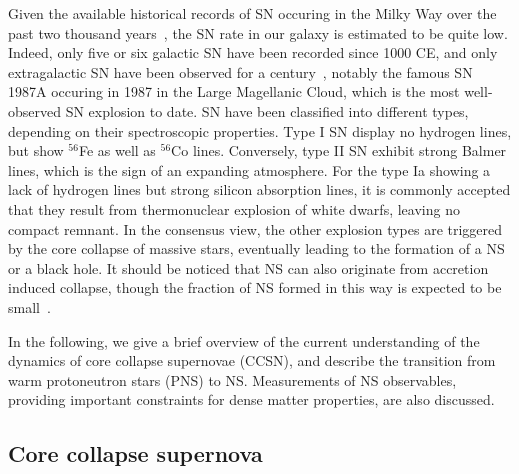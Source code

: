 Given the available historical records of SN occuring in the Milky Way over the
past two thousand years~\cite{Green2003}, the SN rate in our galaxy is 
estimated to be quite low. Indeed, only five or six galactic SN have been 
recorded since 1000 CE, and only extragalactic SN have been observed for a 
century~\cite{Bergh1991}, notably the famous SN 1987A occuring in 1987 in the 
Large Magellanic Cloud, which is the most well-observed SN explosion to date.
SN have been classified into different types, depending on their 
spectroscopic properties. 
Type I SN display no hydrogen lines, but show $^{56}$Fe as well as $^{56}$Co
lines. Conversely, type II SN exhibit strong Balmer lines, which is the sign of
an expanding atmosphere.
%
For the type Ia showing a lack of hydrogen lines but strong silicon absorption 
lines, it is commonly accepted that they result from thermonuclear explosion of 
white dwarfs, leaving no compact remnant.
In the consensus view, the other explosion types are triggered by the core 
collapse of massive stars, eventually leading to the formation of a NS or a 
black hole. 
It should be noticed that NS can also originate from accretion induced 
collapse, though the fraction of NS formed in this way is expected to be 
small~\cite{Fryer1999}.

In the following, we give a brief overview of the current understanding of the 
dynamics of core collapse supernovae (CCSN), and describe the transition from 
warm protoneutron stars (PNS) to NS. Measurements of NS observables, providing 
important constraints for dense matter properties, are also discussed.

\subsection*{Core collapse supernova}

